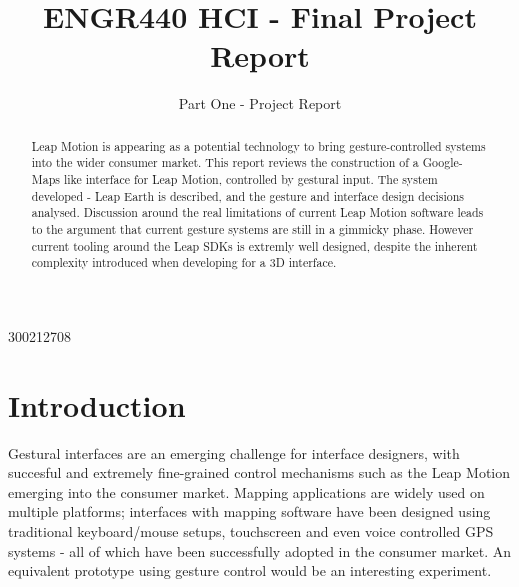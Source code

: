 \documentclass{sigplanconf}
\begin{document}
\setlength{\pdfpageheight}{\paperheight}
\setlength{\pdfpagewidth}{\paperwidth}



\title{ENGR440 HCI - Final Project Report}
\subtitle{Part One - Project Report}

           {300212708}      


\maketitle

\begin{abstract}

Leap Motion is appearing as a potential technology to bring gesture-controlled systems into the wider consumer market. This report reviews the construction of a Google-Maps like interface for Leap Motion, controlled by gestural input. The system developed - Leap Earth is described, and the gesture and interface design decisions analysed. Discussion around the real limitations of current Leap Motion software leads to the argument that current gesture systems are still in a gimmicky phase. However current tooling around the Leap SDKs is extremly well designed, despite the inherent complexity introduced when developing for a 3D interface.

\end{abstract}

\section{Introduction}

Gestural interfaces are an emerging challenge for interface designers, with succesful and extremely fine-grained control mechanisms such as the Leap Motion emerging into the consumer market. Mapping applications are widely used on multiple platforms; interfaces with mapping software have been designed using traditional keyboard/mouse setups, touchscreen and even voice controlled GPS systems - all of which have been successfully adopted in the consumer market. An equivalent prototype using gesture control would be an interesting experiment.
\end{document}
